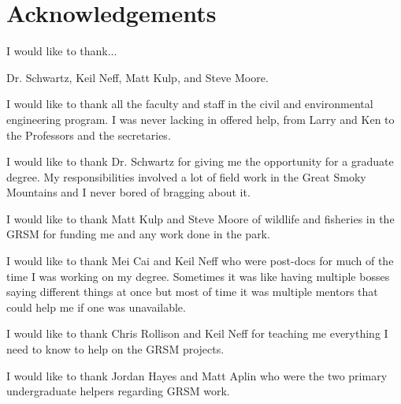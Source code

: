 \chapter*{Acknowledgements}
I would like to thank...

Dr. Schwartz, Keil Neff, Matt Kulp, and Steve Moore.
	
I would like to thank all the faculty and staff in the civil and environmental engineering program.  I was never lacking in offered help, from Larry and Ken to the Professors and the secretaries.
	
I would like to thank Dr. Schwartz for giving me the opportunity for a graduate degree.  My responsibilities involved a lot of field work in the Great Smoky Mountains and I never bored of bragging about it.
	
I would like to thank Matt Kulp and Steve Moore of wildlife and fisheries in the GRSM for funding me and any work done in the park.
	
I would like to thank Mei Cai and Keil Neff who were post-docs for much of the time I was working on my degree.  Sometimes it was like having multiple bosses saying different things at once but most of time it was multiple mentors that could help me if one was unavailable.
	
I would like to thank Chris Rollison and Keil Neff for teaching me everything I need to know to help on the GRSM projects.
	
I would like to thank Jordan Hayes and Matt Aplin who were the two primary undergraduate helpers regarding GRSM work.